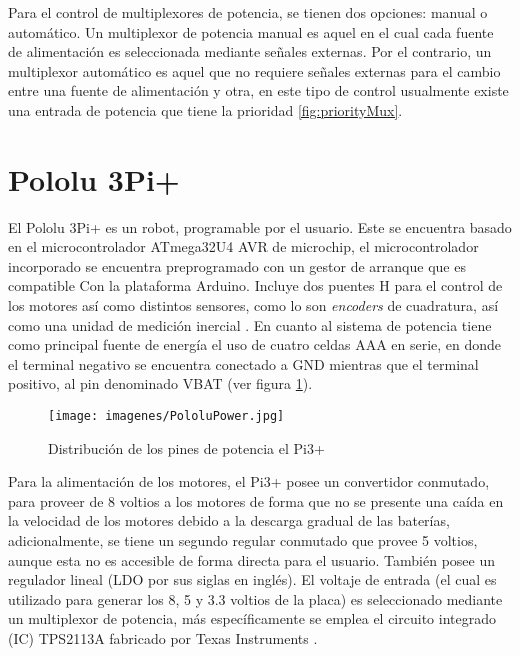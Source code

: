 Para el control de multiplexores de potencia, se tienen dos opciones: manual o automático. Un multiplexor de
potencia manual es aquel en el cual cada fuente de alimentación es seleccionada mediante señales externas. Por el contrario, un multiplexor automático es aquel que no requiere señales externas para el cambio entre 
una fuente de alimentación y otra, en este tipo de control usualmente existe una entrada de potencia que 
tiene la prioridad \ref{fig:priorityMux}.

\section{Pololu 3Pi+}

El Pololu 3Pi+ es un robot, programable por el usuario. Este se encuentra basado en el microcontrolador ATmega32U4 AVR
de microchip, el microcontrolador incorporado se encuentra preprogramado con un gestor de arranque que es compatible
 Con la plataforma Arduino. Incluye dos puentes H para el control de los motores así como distintos sensores, como lo 
 son \textit{encoders} de cuadratura, así como una unidad de medición inercial \cite{noauthor_pololu_nodate}. En cuanto 
 al sistema de potencia tiene como principal fuente de energía el uso de cuatro celdas AAA en serie, en donde el 
 terminal negativo se encuentra conectado a GND mientras que el terminal positivo, al pin denominado VBAT (ver figura
 \ref{fig:power}).

 \begin{figure}[H]
    \centering
    \texttt{[image: imagenes/PololuPower.jpg]}
    \caption{Distribución de los pines de potencia el Pi3+ \cite{noauthor_pololu_nodate}}
    \label{fig:power}
 \end{figure}

 Para la alimentación de los motores, el Pi3+ posee un convertidor conmutado, para proveer de 8 voltios a los motores
 de forma que no se presente una caída en la velocidad de los motores debido a la descarga gradual de las baterías,
 adicionalmente, se tiene un segundo regular conmutado que provee 5 voltios, aunque esta no es accesible de forma directa
 para el usuario. También posee un regulador lineal (LDO por sus siglas en inglés). El voltaje de entrada (el cual es 
 utilizado para generar los 8, 5 y 3.3 voltios de la placa) es seleccionado mediante un multiplexor de potencia, más 
 específicamente se emplea el circuito integrado (IC) TPS2113A fabricado por Texas Instruments \cite{noauthor_pololu_nodate}.

 
